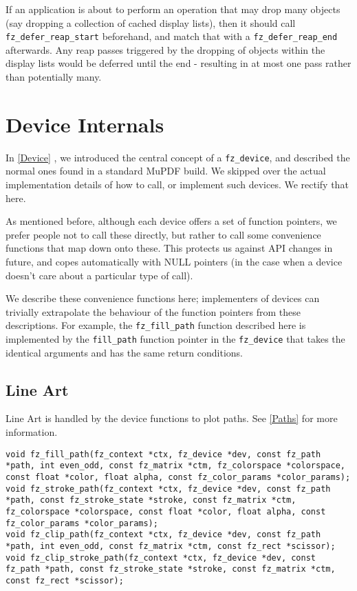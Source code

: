 \documentclass[oneside]{book}
\newcommand{\rjwref}[1] {\autoref{#1} \nameref{#1}}
\begin{document}
If an application is about to perform an operation that may drop many objects (say dropping a collection of cached display lists), then it should call \texttt{fz\_defer\_reap\_start} beforehand, and match that with a \texttt{fz\_defer\_reap\_end} afterwards. Any reap passes triggered by the dropping of objects within the display lists would be deferred until the end - resulting in at most one pass rather than potentially many.

\chapter{Device Internals}
\label{DeviceInternals}

In \rjwref{Device}, we introduced the central concept of a \texttt{fz\_device}, and described the normal ones found in a standard MuPDF build. We skipped over the actual implementation details of how to call, or implement such devices. We rectify that here.

As mentioned before, although each device offers a set of function pointers, we prefer people not to call these directly, but rather to call some convenience functions that map down onto these. This protects us against API changes in future, and copes automatically with NULL pointers (in the case when a device doesn't care about a particular type of call).

We describe these convenience functions here; implementers of devices can trivially extrapolate the behaviour of the function pointers from these descriptions. For example, the \texttt{fz\_fill\_path} function described here is implemented by the \texttt{fill\_path} function pointer in the \texttt{fz\_device} that takes the identical arguments and has the same return conditions.

\section{Line Art}
\label{DevicePaths}

Line Art is handled by the device functions to plot paths. See \rjwref{Paths} for more information.

\begin{lstlisting}
void fz_fill_path(fz_context *ctx, fz_device *dev, const fz_path *path, int even_odd, const fz_matrix *ctm, fz_colorspace *colorspace, const float *color, float alpha, const fz_color_params *color_params);
void fz_stroke_path(fz_context *ctx, fz_device *dev, const fz_path *path, const fz_stroke_state *stroke, const fz_matrix *ctm, fz_colorspace *colorspace, const float *color, float alpha, const fz_color_params *color_params);
void fz_clip_path(fz_context *ctx, fz_device *dev, const fz_path *path, int even_odd, const fz_matrix *ctm, const fz_rect *scissor);
void fz_clip_stroke_path(fz_context *ctx, fz_device *dev, const fz_path *path, const fz_stroke_state *stroke, const fz_matrix *ctm, const fz_rect *scissor);
\end{lstlisting}
\end{document}
